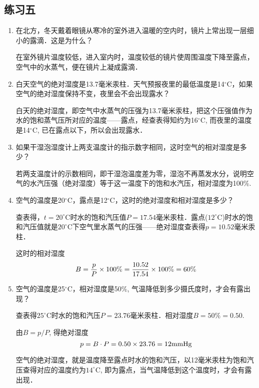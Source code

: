 \subsection{练习五}

\begin{enumerate}
	\item 在北方，冬天戴着眼镜从寒冷的室外进入温暖的空内时，镜片上常出现一层细小的露滴．这是为什么？
    
  \begin{solution}
在室外镜片温度较低，进入室内时，温度较低的镜片使周围温度下降至露点，空气中的水蒸气，便在镜片上凝成露滴．
  \end{solution}
\item 白天空气的绝对湿度是13.7毫米汞柱．天气预报夜里的最低温度是14$^\circ$C，如果空气的绝对湿度保持不变，夜里会不会出现露水？
    
\begin{solution}
  白天的绝对湿度，即空气中水蒸气的压强为13.7毫米汞柱，把这个压强值作为水的饱和蒸气压所对应的温度——露点，经查表得知约为16$^\circ$C, 而夜里的温度是14$^\circ$C, 已在露点以下，所以会出现露水．
\end{solution}
\item 如果干湿泡湿度计上两支温度计的指示数字相同，这时空气的相对湿度是多少？
    
\begin{solution}
若两支温度计的示数相同，即干湿泡温度差为零，湿泡不再蒸发水分，说明空气的水汽压强（绝对湿度）等于这一温度下的饱和水汽压，相对湿度为100\%.
\end{solution}
\item 空气的温度是20$^\circ$C，露点是12$^\circ$C，这时的绝对湿度和相对湿度是多少？
    
\begin{solution}
查表得，$t=20^{\circ}$C时水的饱和汽压值$P=17.54$毫米汞柱．露点($12^{\circ}$C)时水的饱和汽压值就是$20^{\circ}$C下空气里水蒸气的压强——绝对湿度查表得$p=10.52$毫米汞柱．

这时的相对湿度
\[B=\frac{p}{P}\times100\%=\frac{10.52}{17.54}\times100\%=60\%\]
\end{solution}
\item 空气的温度是25$^\circ$C，相对湿度是50\%, 气温降低到多少摄氏度时，才会有露出现？
    
\begin{solution}
  查表得$25^{\circ}$C时水的饱和汽压$P=23.76$毫米汞柱．相对湿度$B=50\%=0.50$.

由$B=p/P$, 得绝对湿度
\[p=B\cdot P=0.50\times23.76=12{\rm mmHg}\]

空气的绝对湿度，就是温度降至露点时水的饱和汽压，以12毫米汞柱为饱和汽压查得对应的温度约为$14^{\circ}$C, 即为露点，当气温降低到这个温度时，才会有露出现．
\end{solution}
\end{enumerate}

